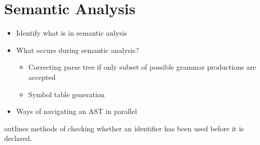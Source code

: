 \begin{comment}
    LLP(q, k) \cite{robin_voetter_parallel_2021}
    \newline \newline
    CYK Parsing \cite{skrzypczak_parallel_nodate}
    \newline \newline
    also mention \cite{mark_thierry_vandevoorde_parallel_1988, alblas_bibliography_1994}
\end{comment}

\section{Semantic Analysis} \label{lit_review_analysis}
    \begin{itemize}
        \item Identify what is in semantic anlysis
        \item What occurs during semantic analysis?
        \begin{itemize}
            \item Correcting parse tree if only subset of possible grammar productions are accepted
            \item Symbol table generation
        \end{itemize}
        \item Ways of navigating an AST in parallel
    \end{itemize}

\cite{komathukattil_evaluating_nodate} outlines methods of checking whether an
identifier has been used before it is declared.

\cite{seshadri_investigation_1991}


